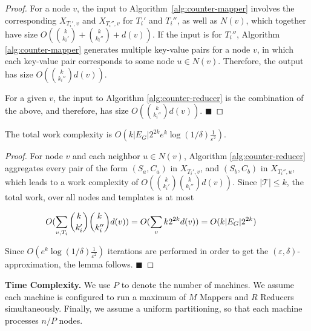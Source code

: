 \begin{proof} 

For a node $v$, the input to Algorithm~\ref{alg:counter-mapper} involves the
corresponding $X_{T_i',v}$ and $X_{T_i'',v}$ for $T_i'$ and $T_i''$, as well as
$N(v)$, which together have size $O({k \choose k_i'} + {k \choose k_i''} +
d(v))$.  If the input is for $T_i''$, Algorithm \ref{alg:counter-mapper}
generates multiple key-value pairs for a node $v$, in which each key-value pair
corresponds to some node $u \in N(v)$.  Therefore, the output has size $O({k
\choose k_i''}d(v))$.

For a given $v$, the input to Algorithm \ref{alg:counter-reducer} is the
combination of the above, and therefore, has size $O({k \choose k_i''}d(v))$. 
\hfill\ensuremath{\blacksquare}
\end{proof}

\begin{lemma}
\label{lemma:workcomp}
The total work complexity is $O(k|E_G|2^{2k}e^k\log{(1/\delta)}\frac{1}{\varepsilon^2})$.
\end{lemma}
\begin{proof}

For node $v$ and each neighbor $u \in N(v)$, Algorithm \ref{alg:counter-reducer}
aggregates every pair of the form $(S_a,C_a)$ in $X_{T_i',v}$, and $(S_b,C_b)$
in $X_{T_i'',u}$, which leads to a work complexity of $O({k \choose k_i'} {k \choose k_i''}d(v))$.
Since $|\mathcal{T}|\leq k$, the total work, over all nodes and templates is at most

\begin{equation}
\hspace*{-0.2in}O(\sum_{v, T_i} {k \choose k_i'} {k \choose k_i''} d(v)) = O(\sum_vk2^{2k}d(v)) = O(k|E_G|2^{2k})
\end{equation}

Since $O(e^k\log{(1/\delta)}\frac{1}{\varepsilon^2})$ iterations are performed
in order to get the $(\varepsilon,\delta)$-approximation, the lemma follows.
\hfill\ensuremath{\blacksquare}
\end{proof}


\noindent
\textbf{Time Complexity.}
We use $P$ to denote the number of machines. We assume each machine is configured to run
a maximum of $M$ Mappers and $R$ Reducers simultaneously.
Finally, we assume a uniform partitioning, so that each machine processes $n/P$ nodes.


